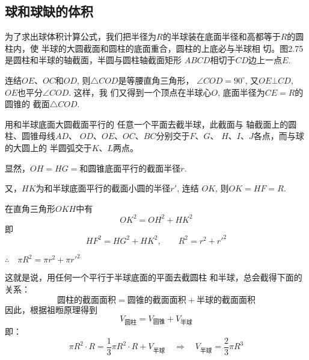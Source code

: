 \subsection{球和球缺的体积}

为了求出球体积计算公式，我们把半径为$R$的半球装在底面半径和高都等于$R$的圆柱内，使
半球的大圆截面和圆柱的底面重合，圆柱的上底必与半球相
切。图2.75是圆柱和半球的轴截面，半圆与圆柱轴截面矩形
$ABCD$相切于$CD$边上一点$E$.

\begin{figure}[htp]
    \centering
{}
    \caption{}
\end{figure}

连结$OE$、$OC$和$OD$, 则$\triangle COD$是等腰直角三角形，
$\angle COD=90^{\circ}$, 又$OE\bot CD$, $OE$也平分$\angle COD$. 这样，我
们又得到一个顶点在半球心$O$, 底面半径为$CE=R$的圆锥的
截面$\triangle COD$.

用和半球底面大圆截面平行的
任意一个平面去截半球，此截面与
轴截面上的圆柱、圆锥母线$AD$、
$OD$、$OE$、$OC$、$BC$分别交于$F$、$G$、
$H$、$I$、$J$各点，而与球的大圆上的
半圆弧交于$K$、$L$两点。

显然，$OH=HG=$和圆锥底面平行的截面半径$r$. 

又，$HK$为和半球底面平行的截面小圆的半径$r'$, 连结
$OK$, 则$OK=HF=R$.

在直角三角形$OKH$中有
\[OK^2=OH^2+HK^2\]
即
\[HF^2=HG^2+HK^2,\qquad R^2=r^2+{r'}^2\]

$\therefore\quad \pi R^2=\pi r^2+\pi {r'}^2$

这就是说，用任何一个平行于半球底面的平面去截圆柱
和半球，总会截得下面的关系：
\[\text{圆柱的截面面积}=\text{圆锥的截面面积}+\text{半球的截面面积}\]
因此，根据祖暅原理得到
\[V_{\text{圆柱}}=V_{\text{圆锥}}+V_{\text{半球}}\]
即：
\[\pi R^2\cdot R=\frac{1}{3}\pi R^2\cdot R+V_{\text{半球}}\quad \Rightarrow\quad V_{\text{半球}}=\frac{2}{3}\pi R^3\]

